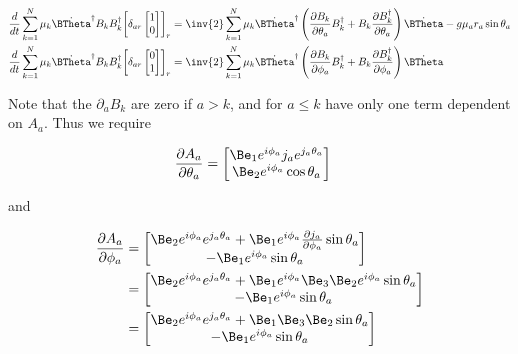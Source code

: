 \begin{align}\label{eqn:multiPendulumSpherical2:boo6}
\frac{d}{dt}
\sum_{k=1}^N \mu_k
\dot{\BTheta}^\dagger 
B_k B_k^\dagger 
{\begin{bmatrix}
\delta_{ar}
\begin{bmatrix}
1 \\
0
\end{bmatrix}
\end{bmatrix}}_r
&=
\inv{2} \sum_{k=1}^N \mu_k
\dot{\BTheta}^\dagger 
\left(
\PD{\theta_a}{B_k} B_k^\dagger + B_k \PD{\theta_a}{B_k^\dagger } \right)
\dot{\BTheta} 
-g \mu_a r_a \sin\theta_a \\
\frac{d}{dt}
\sum_{k=1}^N \mu_k
\dot{\BTheta}^\dagger 
B_k B_k^\dagger 
{\begin{bmatrix}
\delta_{ar}
\begin{bmatrix}
0 \\
1 
\end{bmatrix}
\end{bmatrix}}_r
&=
\inv{2} \sum_{k=1}^N \mu_k
\dot{\BTheta}^\dagger 
\left(
\PD{\phi_a}{B_k} B_k^\dagger + B_k \PD{\phi_a}{B_k^\dagger } \right)
\dot{\BTheta} 
\end{align}

Note that the $\partial_a B_k$ are zero if $a > k$, and for $a \le k$ have only one term dependent on $A_a$.  Thus we require

\begin{align*}
\PD{\theta_a}{A_a} &=
\begin{bmatrix}
\Be_1 e^{i \phi_a} j_a e^{j_a \theta_a} \\
\Be_2 e^{i \phi_a} \cos\theta_a 
\end{bmatrix} 
\end{align*}

and

\begin{align*}
\PD{\phi_a}{A_a} 
&=
\begin{bmatrix}
\Be_2 e^{i \phi_a} e^{j_a \theta_a} 
+\Be_1 e^{i \phi_a} \PD{\phi_a}{j_a} \sin\theta_a
\\
-\Be_1 e^{i \phi_a} \sin\theta_a 
\end{bmatrix} \\
&=
\begin{bmatrix}
\Be_2 e^{i \phi_a} e^{j_a \theta_a} 
+\Be_1 e^{i \phi_a} \Be_3 \Be_2 e^{i\phi_a} \sin\theta_a
\\
-\Be_1 e^{i \phi_a} \sin\theta_a 
\end{bmatrix} \\
&=
\begin{bmatrix}
\Be_2 e^{i \phi_a} e^{j_a \theta_a} 
+\Be_1 \Be_3 \Be_2 \sin\theta_a
\\
-\Be_1 e^{i \phi_a} \sin\theta_a 
\end{bmatrix} \\
\end{align*}

\EndNoBibArticle
